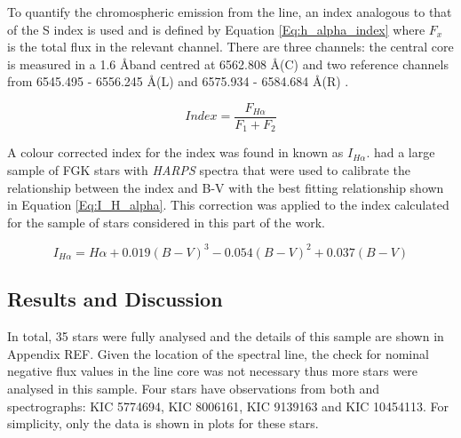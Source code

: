 To quantify the chromospheric emission from the \Halpha line, an index analogous to that of the S index is used and is defined by Equation \ref{Eq:h_alpha_index} where $F_{x}$ is the total flux in the relevant channel. There are three channels: the central \Halpha core is measured in a 1.6 \AA \space band centred at 6562.808 \AA \space (C) and two reference channels from 6545.495 - 6556.245 \AA \space (L) and 6575.934 - 6584.684 \AA \space (R) \citep{Gomes_da_Silva_etal_2011}.

\begin{equation}
    Index = \frac{F_{H{\alpha}}}{F_{1}+F_{2}}
    \label{Eq:h_alpha_index}
\end{equation}

A colour corrected index for the \Halpha index was found in \citet{Gomes_da_Silva_etal_2014} known as $I_{H\alpha}$. \citet{Gomes_da_Silva_etal_2014} had a large sample of FGK stars with \textit{HARPS} spectra that were used to calibrate the relationship between the \Halpha index and B-V with the best fitting relationship shown in Equation \ref{Eq:I_H_alpha}. This correction was applied to the \Halpha index calculated for the sample of stars considered in this part of the work.

\begin{equation}
    I_{H\alpha} = H\alpha + 0.019(B-V)^{3} - 0.054(B-V)^{2} + 0.037(B-V)
    \label{Eq:I_H_alpha}
\end{equation}

\subsection{Results and Discussion}
In total, 35 stars were fully analysed and the details of this sample are shown in Appendix REF. Given the location of the \Halpha spectral line, the check for nominal negative flux values in the line core was not necessary thus more stars were analysed in this sample. Four stars have observations from both \esp and \narval spectrographs: KIC 5774694, KIC 8006161, KIC 9139163 and KIC 10454113. For simplicity, only the \narval data is shown in plots for these stars.

